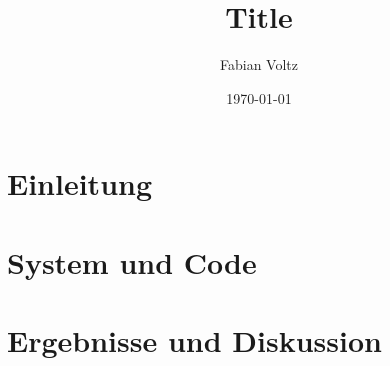 \documentclass[12pt,german]{revtex4}
\begin{document}
\title{Title}
\author{Fabian Voltz}
\date{\today}


\begin{abstract}

\end{abstract}



\maketitle

\section{Einleitung}
\label{sec:Einleitung}




\section{System und Code}
\label{sec:System und Code}




\section{Ergebnisse und Diskussion}
\label{sec:Ergebnisse}







%
%
\end{document}

